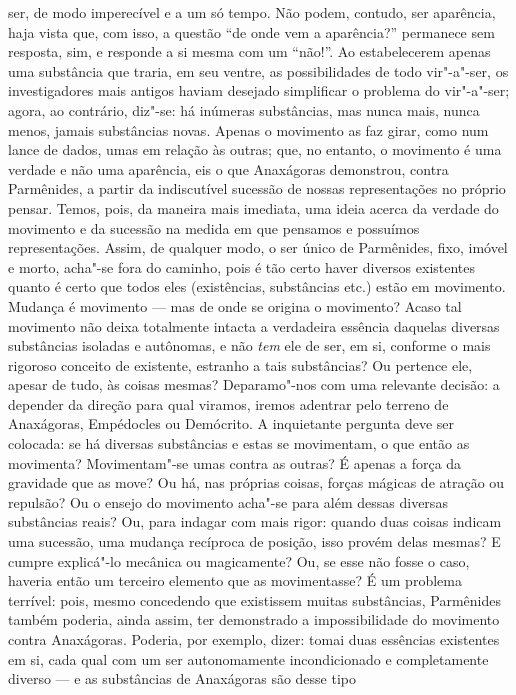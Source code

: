 ser, de modo imperecível e a um só tempo. Não podem, contudo, ser aparência,
haja vista que, com isso, a questão ``de onde vem a aparência?'' permanece
sem resposta, sim, e responde a si mesma com um ``não!''. Ao estabelecerem
apenas uma substância que traria, em seu ventre, as possibilidades de todo
vir"-a"-ser, os investigadores mais antigos haviam desejado simplificar o
problema do vir"-a"-ser; agora, ao contrário, diz"-se: há inúmeras
substâncias, mas nunca mais, nunca menos, jamais substâncias novas. Apenas o
movimento as faz girar, como num lance de dados, umas em relação às outras;
que, no entanto, o movimento é uma verdade e não uma aparência, eis o que
Anaxágoras demonstrou, contra Parmênides, a partir da indiscutível sucessão
de nossas representações no próprio pensar. Temos, pois, da maneira mais
imediata, uma ideia acerca da verdade do movimento e da sucessão na medida em
que pensamos e possuímos representações. Assim, de qualquer modo, o ser único
de Parmênides, fixo, imóvel e morto, acha"-se fora do caminho, pois é tão
certo haver diversos existentes quanto é certo que todos eles
(existências, substâncias etc.) estão em movimento. Mudança é movimento ---
mas de onde se origina o movimento? Acaso tal movimento não deixa totalmente
intacta a verdadeira essência daquelas diversas substâncias isoladas e
autônomas, e não \textit{tem} ele de ser, em si, conforme o mais rigoroso
conceito de existente, estranho a tais substâncias? Ou pertence ele, apesar
de tudo, às coisas mesmas? Deparamo"-nos com uma relevante decisão: a
depender da direção para qual viramos, iremos adentrar pelo terreno de
Anaxágoras, Empédocles ou Demócrito. A inquietante pergunta deve ser
colocada: se há diversas substâncias e estas se movimentam, o que então as
movimenta? Movimentam"-se umas contra as outras? É apenas a força da
gravidade que as move? Ou há, nas próprias coisas, forças mágicas de atração
ou repulsão? Ou o ensejo do movimento acha"-se para além dessas diversas
substâncias reais? Ou, para indagar com mais rigor: quando duas coisas
indicam uma sucessão, uma mudança recíproca de posição, isso provém delas
mesmas? E cumpre explicá"-lo mecânica ou magicamente? Ou, se esse não fosse o
caso, haveria então um terceiro elemento que as movimentasse? É um problema
terrível: pois, mesmo concedendo que existissem muitas substâncias,
Parmênides também poderia, ainda assim, ter demonstrado a impossibilidade do
movimento contra Anaxágoras. Poderia, por exemplo, dizer: tomai duas
essências existentes em si, cada qual com um ser autonomamente incondicionado
e completamente diverso --- e as substâncias de Anaxágoras são desse tipo
